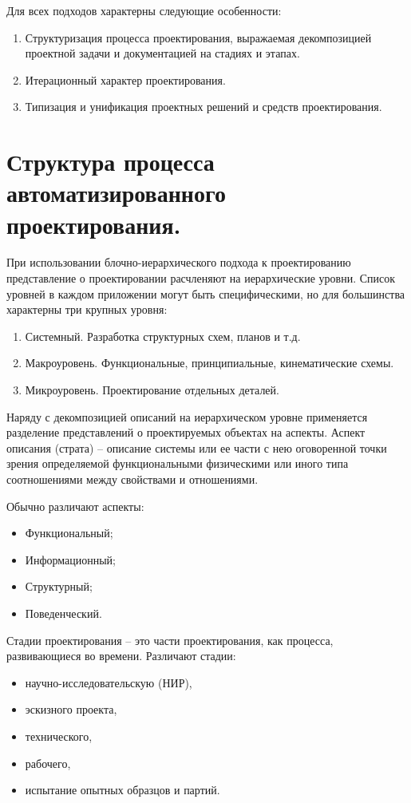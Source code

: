 \documentclass[unicode, 12pt, a4paper, oneside]{article}
\begin{document}
Для всех подходов характерны следующие особенности:
\begin{enumerate}
\item Структуризация процесса проектирования, выражаемая декомпозицией проектной задачи и документацией на стадиях и этапах.
\item Итерационный характер проектирования.
\item Типизация и унификация проектных решений и средств проектирования.
\end{enumerate}

\section{Структура процесса автоматизированного проектирования.}

При использовании блочно-иерархического подхода к проектированию представление о проектировании расчленяют на иерархические уровни. Список уровней в каждом приложении могут быть специфическими, но для большинства характерны три крупных уровня:

\begin{enumerate}
\item Системный. Разработка структурных схем, планов и т.д.
\item Макроуровень. Функциональные, принципиальные, кинематические схемы.
\item Микроуровень. Проектирование отдельных деталей.
\end{enumerate}

Наряду с декомпозицией описаний на иерархическом уровне применяется разделение представлений о проектируемых объектах на аспекты. Аспект описания (страта) – описание системы или ее части с нею оговоренной точки зрения определяемой функциональными физическими или иного типа соотношениями между свойствами и отношениями.

Обычно различают аспекты: 
\begin{itemize}
\item Функциональный;
\item Информационный;
\item Структурный;
\item Поведенческий.
\end{itemize}

Стадии проектирования – это части проектирования, как процесса, развивающиеся во времени. Различают стадии:
\begin{itemize}
\item научно-исследовательскую (НИР),
\item эскизного проекта,
\item технического,
\item рабочего,
\item испытание опытных образцов и партий.
\end{itemize}
\end{document}
